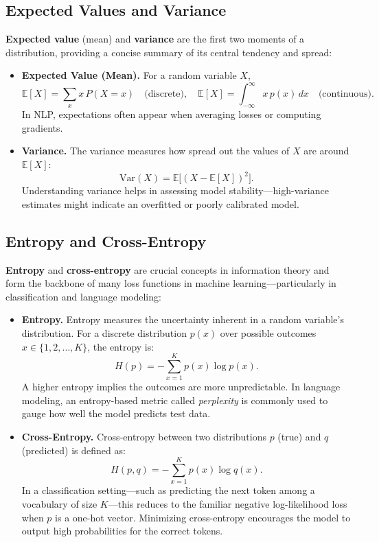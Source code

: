 \subsection{Expected Values and Variance}
\noindent
\textbf{Expected value} (mean) and \textbf{variance} are the first two moments of a distribution, providing a concise summary of its central tendency and spread:
\begin{itemize}
    \item \textbf{Expected Value (Mean).} 
    For a random variable $X$,
    \[
    \mathbb{E}[X] = \sum_x x \, P(X = x) \quad \text{(discrete)}, \quad
    \mathbb{E}[X] = \int_{-\infty}^{\infty} x \, p(x) \, dx \quad \text{(continuous)}.
    \]
    In NLP, expectations often appear when averaging losses or computing gradients.

    \item \textbf{Variance.} 
    The variance measures how spread out the values of $X$ are around $\mathbb{E}[X]$:
    \[
    \mathrm{Var}(X) = \mathbb{E}\bigl[(X - \mathbb{E}[X])^2\bigr].
    \]
    Understanding variance helps in assessing model stability—high-variance estimates might indicate an overfitted or poorly calibrated model.
\end{itemize}

\subsection{Entropy and Cross-Entropy}
\noindent
\textbf{Entropy} and \textbf{cross-entropy} are crucial concepts in information theory and form the backbone of many loss functions in machine learning—particularly in classification and language modeling:

\begin{itemize}
    \item \textbf{Entropy.}
    Entropy measures the uncertainty inherent in a random variable’s distribution. For a discrete distribution $p(x)$ over possible outcomes $x \in \{1, 2, \ldots, K\}$, the entropy is:
    \[
    H(p) = - \sum_{x=1}^{K} p(x) \log p(x).
    \]
    A higher entropy implies the outcomes are more unpredictable. In language modeling, an entropy-based metric called \emph{perplexity} is commonly used to gauge how well the model predicts test data.

    \item \textbf{Cross-Entropy.}
    Cross-entropy between two distributions $p$ (true) and $q$ (predicted) is defined as:
    \[
    H(p, q) = - \sum_{x=1}^{K} p(x) \log q(x).
    \]
    In a classification setting—such as predicting the next token among a vocabulary of size $K$—this reduces to the familiar negative log-likelihood loss when $p$ is a one-hot vector. Minimizing cross-entropy encourages the model to output high probabilities for the correct tokens.

\end{itemize}


